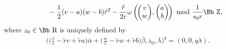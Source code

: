 \documentclass[pdftex]{sigma}
\newcommand\RR{{\mbox{\Bb R}}}
\newcommand\ZZ{{\mbox{\Bb Z}}}
\newcommand\bs{\textbf{{\rm \textbf{s}}}}
\numberwithin{equation}{section}
\begin{document}
\begin{Definition}
\begin{enumerate}
\begin{enumerate}
\begin{gather*}
\\[0.5ex] \hphantom{\bs_L=}
{}-\frac{1}{2}(v-a)(w-b)\tilde r^2
-\frac{\tilde r}{2r}\omega\left(\!\begin{pmatrix}v\\w\end{pmatrix}\!, \begin{pmatrix}a\\b\end{pmatrix}\!\right)\ {\rm mod}\ \frac{1}{s_0r}\ZZ,
\end{gather*}
where $z_0\in\RR$ is uniquely defined by
\begin{gather*}
\bigg(\bigg(\frac vr-\tilde rv+\tilde ra\bigg)\bar\alpha+\bigg(\frac{w}{r}-\tilde rw+\tilde rb\bigg)\bar\beta,z_0,\lambda\bigg)^q=(0,0,q\lambda).
\end{gather*}
\end{enumerate}
\end{enumerate}
\end{Definition}
\end{document}
